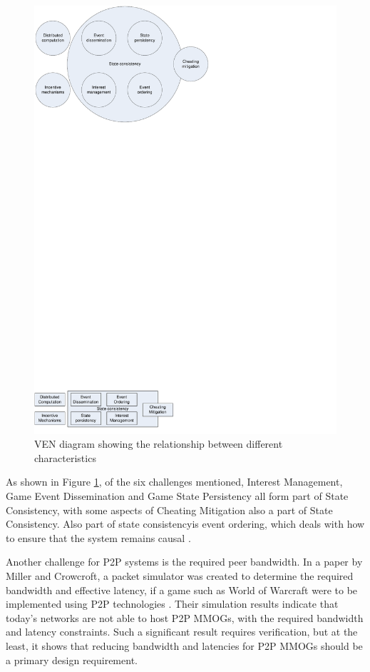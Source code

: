 \documentclass[10pt,a4paper,journal,cspaper,compsoc]{IEEEtran}
\begin{document}
\begin{figure}[htbp]
 \centering
 \includegraphics[clip=true, viewport=0cm 0cm 10cm 3cm, width=\columnwidth]{Component_VEN}
 \caption{VEN diagram showing the relationship between different characteristics}
 \label{fig_component_ven}
\end{figure}
%
As shown in Figure \ref{fig_component_ven}, of the six challenges mentioned, Interest Management, Game Event Dissemination and Game State Persistency
all form part of State Consistency, with some aspects of Cheating Mitigation also a part of State Consistency. Also part of state consistencyis event
ordering, which deals with how to ensure that the system remains causal \cite{GauthierDickey_low_latency_event_ordering}.

Another challenge for P2P systems is the required peer bandwidth. In a paper by Miller and Crowcroft, a packet simulator was created to determine the
required bandwidth and effective latency, if a game such as World of Warcraft were to be implemented using P2P technologies
\cite{Miller_p2p_infeasability}. Their simulation results indicate that today's networks are not able to host P2P MMOGs, with the required bandwidth
and latency constraints. Such a significant result requires verification, but at the least, it shows that reducing bandwidth and latencies for P2P
MMOGs should be a primary design requirement.
\end{document}
